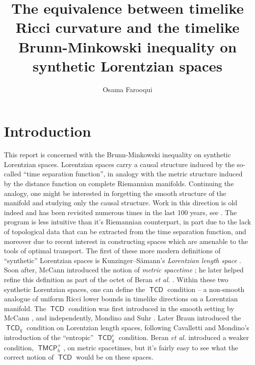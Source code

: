 \documentclass{article}
\title{The equivalence between timelike Ricci curvature and the timelike Brunn-Minkowski inequality on synthetic Lorentzian spaces}
\author{Osama Farooqui}
\DeclareMathOperator{\TCD}{\mathsf{TCD}}
\DeclareMathOperator{\TMCP}{\mathsf{TMCP}}
\theoremstyle{definition}
\begin{document}
\maketitle
\tableofcontents

\section{Introduction}

This report is concerned with the Brunn-Minkowski inequality on synthetic Lorentzian spaces. Lorentzian spaces carry a causal structure induced by the so-called ``time separation function'', in analogy with the metric structure induced by the distance function on complete Riemannian manifolds. Continuing the analogy, one might be interested in forgetting the smooth structure of the manifold and studying only the causal structure. Work in this direction is old indeed and has been revisited numerous times in the last 100 years, see \cite{Robb, KP, Noldus, KS}. The program is less intuitive than it's Riemannian counterpart, in part due to the lack of topological data that can be extracted from the time separation function, and moreover due to recent interest in constructing spaces which are amenable to the tools of optimal transport. The first of these more modern definitions of ``synthetic'' Lorentzian spaces is Kunzinger--S\"amann's {\it Lorentzian length space} \cite{KS}. Soon after, McCann introduced the notion of {\it metric spacetime} \cite{McCannII}; he later helped refine this definition as part of the octet of Beran {\it et al.\@} \cite{Octet}. Within these two synthetic Lorentzian spaces, one can define the $\TCD$ condition -- a non-smooth analogue of uniform Ricci lower bounds in timelike directions on a Lorentzian manifold. The $\TCD$ condition was first introduced in the smooth setting by McCann \cite{McCann}, and independently, Mondino and Suhr \cite{MS}. Later Braun \cite{Braun} introduced the $\TCD_q$ condition on Lorentzian length spaces, following Cavalletti and Mondino's \cite{CM} introduction of the ``entropic'' $\TCD^e_q$ condition. Beran {\it et al.\@} introduced a weaker condition, $\TMCP_h^+$, on metric spacetimes, but it's fairly easy to see what the correct notion of $\TCD$ would be on these spaces. 
\end{document}
